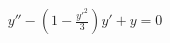 \documentclass[preview]{standalone}
\begin{document}
\begin{align*}
y''-\left(1-\frac{y'^2}{3}\right)y'+y=0
\end{align*}
\end{document}

